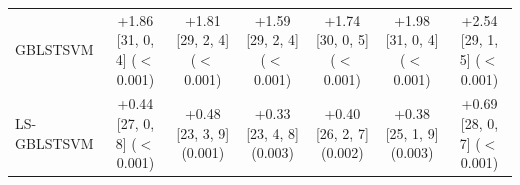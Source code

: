 \begin{table}[!t]
{\begin{tabular}{lcccccc}
GBLSTSVM & \shortstack{+1.86 [31, 0, 4]\\($<$0.001)} & \shortstack{+1.81 [29, 2, 4]\\($<$0.001)} & \shortstack{+1.59 [29, 2, 4]\\($<$0.001)} & \shortstack{+1.74 [30, 0, 5]\\($<$0.001)} & \shortstack{+1.98 [31, 0, 4]\\($<$0.001)} & \shortstack{+2.54 [29, 1, 5]\\($<$0.001)} \\[4pt]
LS-GBLSTSVM & \shortstack{+0.44 [27, 0, 8]\\($<$0.001)} & \shortstack{+0.48 [23, 3, 9]\\(0.001)} & \shortstack{+0.33 [23, 4, 8]\\(0.003)} & \shortstack{+0.40 [26, 2, 7]\\(0.002)} & \shortstack{+0.38 [25, 1, 9]\\(0.003)} & \shortstack{+0.69 [28, 0, 7]\\($<$0.001)} \\[4pt]
\bottomrule
\end{tabular}}
\end{table}
